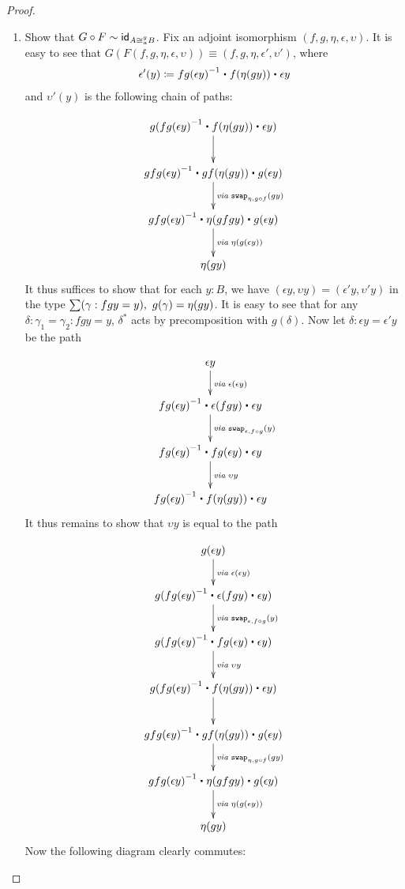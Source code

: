 \begin{proof}
\begin{description}
\begin{enumerate}
\item Show that $G \circ F \sim \idfunc[A \cong^g_a B]$. Fix an adjoint isomorphism $(f,g,\eta,\epsilon,\upsilon)$. It is easy to see that $G(F(f,g,\eta,\epsilon,\upsilon)) \equiv (f,g,\eta, \epsilon', \upsilon')$, where
\begin{align*}
\epsilon'(y) \defeq \opp{fg(\epsilon y)} \ct f(\eta (g y)) \ct \epsilon y
\end{align*}
and $\upsilon'(y)$ is the following chain of paths:

\begin{align*}
\xymatrix{
g(\opp{fg(\epsilon y)} \ct f(\eta (g y)) \ct \epsilon y) \ar[d] \\
\opp{gfg(\epsilon y)} \ct gf(\eta (g y)) \ct g(\epsilon y) \ar[d]^{\mathit{via\;}\com{\eta}{g\circ f}{gy}} \\
\opp{gfg(\epsilon y)} \ct \eta (gfgy) \ct g(\epsilon y) \ar[d]^{\mathit{via \;} \eta(g(\epsilon y))} \\
\eta(g y)}
\end{align*}
It thus suffices to show that for each $y : B$, we have $(\epsilon y,\upsilon y) = (\epsilon' y,\upsilon' y)$ in the type $\sm{\gamma : fgy = y} g(\gamma) = \eta(g y)$. It is easy to see that for any $\delta : \gamma_1 = \gamma_2 : fgy = y$, $\delta^*$ acts by precomposition with $g(\delta)$. Now let $\delta : \epsilon y = \epsilon' y$ be the path 

\begin{align*}
\xymatrix{
\epsilon y \ar[d]^{\mathit{via \;} \epsilon(\epsilon y)} \\
\opp{fg(\epsilon y)} \ct \epsilon (f g y) \ct \epsilon y \ar[d]^{\mathit{via \; } \com{\epsilon}{f \circ g}{y}} \\
\opp{fg(\epsilon y)} \ct fg (\epsilon y) \ct \epsilon y \ar[d]^{\mathit{via \;} \upsilon y} \\
\opp{fg(\epsilon y)} \ct f (\eta(g y)) \ct \epsilon y}
\end{align*}
It thus remains to show that $\upsilon y$ is equal to the path

\begin{align*}
\xymatrix{
g(\epsilon y) \ar[d]^{\mathit{via \;} \epsilon(\epsilon y)} \\
g(\opp{fg(\epsilon y)} \ct \epsilon (f g y) \ct \epsilon y) \ar[d]^{\mathit{via \; } \com{\epsilon}{f \circ g}{y}} \\
g(\opp{fg(\epsilon y)} \ct fg (\epsilon y) \ct \epsilon y) \ar[d]^{\mathit{via \;} \upsilon y} \\
g(\opp{fg(\epsilon y)} \ct f (\eta(g y)) \ct \epsilon y) \ar[d] \\
\opp{gfg(\epsilon y)} \ct gf(\eta (g y)) \ct g(\epsilon y) \ar[d]^{\mathit{via\;}\com{\eta}{g\circ f}{gy}} \\
\opp{gfg(\epsilon y)} \ct \eta (gfgy) \ct g(\epsilon y) \ar[d]^{\mathit{via \;} \eta(g(\epsilon y))} \\
\eta(g y)}
\end{align*}
Now the following diagram clearly commutes:


\end{enumerate}
\end{description}
\end{proof}
